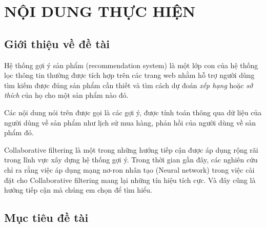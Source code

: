 \documentclass{article}[14pt]
\begin{document}
    \section{NỘI DUNG THỰC HIỆN}
    {

    
    \subsection{Giới thiệu về đề tài}
    

    Hệ thống gợi ý sản phẩm (recommendation system) là một lớp con của hệ thống lọc thông tin thường được tích hợp trên các trang web nhằm hỗ trợ người dùng tìm kiếm được đúng sản phẩm cần thiết  và tìm cách dự đoán \textit{xếp hạng} hoặc \textit{sở thích} của họ cho một sản phẩm nào đó.
    
    Các nội dung nói trên được gọi là các gợi ý, được tính toán thông qua dữ liệu của người dùng về sản phẩm như lịch sử mua hàng, phản hồi của người dùng về sản phẩm đó.
    
    
    Collaborative filtering là một trong những hướng tiếp cận được áp dụng rộng rãi trong lĩnh vực xây dựng hệ thống gợi ý.
    Trong thời gian gần đây, các nghiên cứu chỉ ra rằng việc áp dụng mạng nơ-ron nhân tạo (Neural network) trong việc cài đặt cho Collaborative filtering mang lại những tín hiệu tích cực. 
    Và đây cũng là hướng tiếp cận mà chúng em chọn để tìm hiểu.
    
    
    \subsection{Mục tiêu đề tài}
    
}
\end{document}
